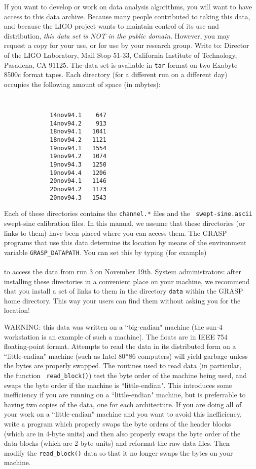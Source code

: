 If you want to develop or work on data analysis algorithms, you will
want to have access to this data archive.  Because many people
contributed to taking this data, and because the LIGO project wants to
maintain control of its use and distribution, {\it this data set is NOT
in the public domain}.  However, you may request a copy for your use,
or for use by your research group.  Write to: Director of the LIGO
Laboratory, Mail Stop 51-33, California Institute of Technology,
Pasadena, CA 91125.  The data set is available in {\tt tar} format on
two Exabyte 8500c format tapes.  Each directory (for a different run
on a different day) occupies the following amount of space (in mbytes):
{\tt
\begin{verbatim}
             14nov94.1    647
             14nov94.2    913
             18nov94.1   1041
             18nov94.2   1121
             19nov94.1   1554
             19nov94.2   1074
             19nov94.3   1250
             19nov94.4   1206
             20nov94.1   1146
             20nov94.2   1173
             20nov94.3   1543
\end{verbatim}
}
\noindent
Each of these directories contains the {\tt channel.*} files and the {\tt
swept-sine.ascii} swept-sine calibration files.  In this manual, we assume
that these directories (or links to them) have been placed where you can
access them.  The GRASP programs that use this data determine its location
by means of the environment variable {\tt GRASP\_DATAPATH}.  You can
set this by typing (for example)\\ \\ to access the data from run 3 on November
19th.  System administrators: after installing these directories in a
convenient place on your machine, we recommend that you install a set of
links to them in the directory {\tt data} within the GRASP home directory.
This way your users can find them without asking you for the location!

WARNING:  this data was written on a ``big-endian" machine (the sun-4
workstation is an example of such a machine).  The floats are in IEEE
754 floating-point format.  Attempts to read the data in its
distributed form on a ``little-endian" machine (such as Intel 80*86
computers) will yield garbage unless the bytes are properly swapped.
The routines used to read data (in particular, the function {\tt
read\_block()}) test the byte order of the machine being used, and swaps
the byte order if the machine is ``little-endian".  This introduces
some inefficiency if you are running on a ``little-endian" machine, but
is preferrable to having two copies of the data, one for each
architecture.  If you are doing all of your work on a ``little-endian"
machine and you want to avoid this inefficiency, write a program which
properly swaps the byte orders of the header blocks (which are in
4-byte units) and then also properly swaps the byte order of the data
blocks (which are 2-byte units) and reformat the raw data files.  Then
modify the {\tt read\_block()} data so that it no longer swaps the bytes
on your machine.

